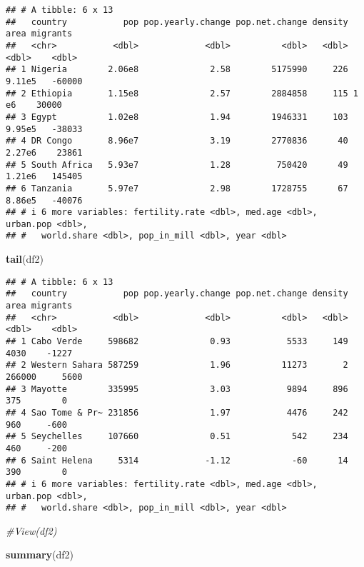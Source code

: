 \documentclass[
]{article}
\newenvironment{Shaded}{\begin{snugshade}}{\end{snugshade}}
\newcommand{\CommentTok}[1]{\textcolor[rgb]{0.56,0.35,0.01}{\textit{#1}}}
\newcommand{\FunctionTok}[1]{\textcolor[rgb]{0.13,0.29,0.53}{\textbf{#1}}}
\newcommand{\NormalTok}[1]{#1}
\begin{document}
\begin{verbatim}
## # A tibble: 6 x 13
##   country           pop pop.yearly.change pop.net.change density   area migrants
##   <chr>           <dbl>             <dbl>          <dbl>   <dbl>  <dbl>    <dbl>
## 1 Nigeria        2.06e8              2.58        5175990     226 9.11e5   -60000
## 2 Ethiopia       1.15e8              2.57        2884858     115 1   e6    30000
## 3 Egypt          1.02e8              1.94        1946331     103 9.95e5   -38033
## 4 DR Congo       8.96e7              3.19        2770836      40 2.27e6    23861
## 5 South Africa   5.93e7              1.28         750420      49 1.21e6   145405
## 6 Tanzania       5.97e7              2.98        1728755      67 8.86e5   -40076
## # i 6 more variables: fertility.rate <dbl>, med.age <dbl>, urban.pop <dbl>,
## #   world.share <dbl>, pop_in_mill <dbl>, year <dbl>
\end{verbatim}

\begin{Shaded}
\begin{Highlighting}[]
\FunctionTok{tail}\NormalTok{(df2)}
\end{Highlighting}
\end{Shaded}

\begin{verbatim}
## # A tibble: 6 x 13
##   country           pop pop.yearly.change pop.net.change density   area migrants
##   <chr>           <dbl>             <dbl>          <dbl>   <dbl>  <dbl>    <dbl>
## 1 Cabo Verde     598682              0.93           5533     149   4030    -1227
## 2 Western Sahara 587259              1.96          11273       2 266000     5600
## 3 Mayotte        335995              3.03           9894     896    375        0
## 4 Sao Tome & Pr~ 231856              1.97           4476     242    960     -600
## 5 Seychelles     107660              0.51            542     234    460     -200
## 6 Saint Helena     5314             -1.12            -60      14    390        0
## # i 6 more variables: fertility.rate <dbl>, med.age <dbl>, urban.pop <dbl>,
## #   world.share <dbl>, pop_in_mill <dbl>, year <dbl>
\end{verbatim}

\begin{Shaded}
\begin{Highlighting}[]
\CommentTok{\#View(df2)}

\FunctionTok{summary}\NormalTok{(df2)}
\end{Highlighting}
\end{Shaded}
\end{document}
